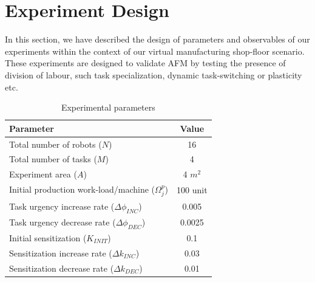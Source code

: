 \documentclass{llncs}
\begin{document}
\section{Experiment Design}
\label{sec:expt-design}
In this section, we have described the design of parameters and observables of our experiments within the context of our virtual manufacturing shop-floor scenario. 
These experiments are designed to validate AFM by testing the presence of division of labour, such task specialization, dynamic task-switching or plasticity etc. 
\begin{table}
\caption{Experimental parameters}
\label{table:params}
\begin{center}
\begin{tabular}{|l||c|}
\hline Parameter & Value\\
\hline Total number of robots ($N$) & 16\\
\hline Total number of tasks ($M$) & 4\\
\hline Experiment area ($A$) & 4 $m^2$\\
\hline Initial production work-load/machine ($\Omega_{j}^{p}$) & 100 unit\\
\hline Task urgency increase rate ($\Delta\phi_{INC}$) & 0.005\\
\hline Task urgency decrease rate ($\Delta\phi_{DEC}$) & 0.0025\\
\hline Initial sensitization ($K_{INIT}$) & 0.1\\
\hline Sensitization increase rate ($\Delta k_{INC}$) & 0.03\\
\hline Sensitization decrease rate ($\Delta k_{DEC}$) & 0.01\\
\hline
\end{tabular}
\end{center}
\end{table}
% 
\end{document}
